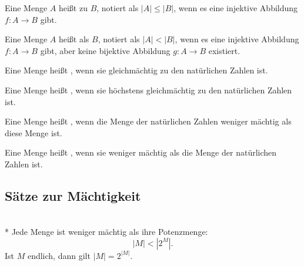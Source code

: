\begin{definition}\mbox{}\newline
Eine Menge $A$ heißt  zu $B$,
notiert als $|A|\le|B|$, wenn es eine injektive Abbildung
$f\colon A\to B$ gibt.
\end{definition}

\begin{definition}\mbox{}\newline
Eine Menge $A$ heißt  als $B$,
notiert als $|A|<|B|$, wenn es eine injektive Abbildung
$f\colon A\to B$ gibt, aber keine bijektive Abbildung
$g\colon A\to B$ existiert.
\end{definition}

\begin{definition}\mbox{}\newline
Eine Menge heißt , wenn sie gleichmächtig
zu den natürlichen Zahlen ist.
\end{definition}

\begin{definition}\mbox{}\newline
Eine Menge heißt , wenn sie höchstens
gleichmächtig zu den natürlichen Zahlen ist.
\end{definition}

\begin{definition}[Überabzählbar]\mbox{}\newline
Eine Menge heißt , wenn die Menge der
natürlichen Zahlen weniger mächtig als diese Menge ist.
\end{definition}

\begin{definition}\mbox{}\newline
Eine Menge heißt , wenn sie weniger mächtig
als die Menge der natürlichen Zahlen ist.
\end{definition}

\subsection{Sätze zur Mächtigkeit}
\begin{Satz}\mbox{}\\*
Jede Menge ist weniger mächtig als ihre Potenzmenge:
\begin{equation}
|M|<|2^M|.
\end{equation}
Ist $M$ endlich, dann gilt $|M|=2^{|M|}$.
\end{Satz}

